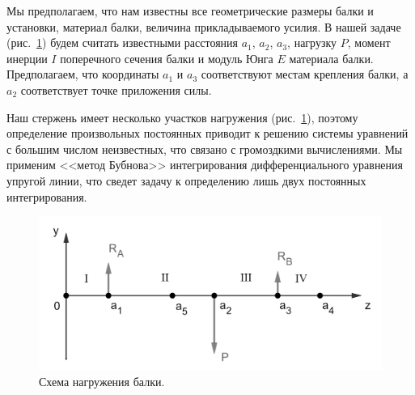 \documentclass[12pt, a4paper]{article}
\begin{document}
    Мы предполагаем, что нам известны все геометрические размеры балки и установки, материал балки, величина прикладываемого усилия. В нашей задаче (рис.~\ref{im4}) будем считать известными расстояния $a_{1}$, $a_{2}$, $a_{3}$, нагрузку $P$, момент инерции $I$ поперечного сечения балки и модуль Юнга $E$ материала балки. Предполагаем, что координаты $a_{1}$ и $a_{3}$ соответствуют местам крепления балки, а $a_{2}$ соответствует точке приложения силы.
    
    Наш стержень имеет несколько участков нагружения (рис.~\ref{im4}), поэтому определение произвольных постоянных приводит к решению системы уравнений с большим числом неизвестных, что связано с громоздкими вычислениями. Мы применим <<метод Бубнова>> интегрирования дифференциального уравнения упругой линии, что сведет задачу к определению лишь двух постоянных интегрирования.
    
    \begin{figure}[h]
        \centering
        \includegraphics[width = 14cm]{image_4.png}
        \caption{Схема нагружения балки.}
        \label{im4}
    \end{figure}
    
\end{document}
